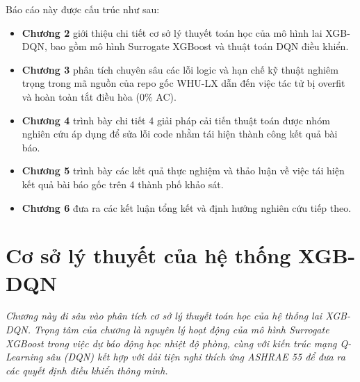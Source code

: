 \documentclass[12pt, a4paper]{report}
\begin{document}
Báo cáo này được cấu trúc như sau:
\begin{itemize}
    \item \textbf{Chương 2} giới thiệu chi tiết cơ sở lý thuyết toán học của mô hình lai XGB-DQN, bao gồm mô hình Surrogate XGBoost và thuật toán DQN điều khiển.
    \item \textbf{Chương 3} phân tích chuyên sâu các lỗi logic và hạn chế kỹ thuật nghiêm trọng trong mã nguồn của repo gốc WHU-LX dẫn đến việc tác tử bị overfit và hoàn toàn tắt điều hòa (0\% AC).
    \item \textbf{Chương 4} trình bày chi tiết 4 giải pháp cải tiến thuật toán được nhóm nghiên cứu áp dụng để sửa lỗi code nhằm tái hiện thành công kết quả bài báo.
    \item \textbf{Chương 5} trình bày các kết quả thực nghiệm và thảo luận về việc tái hiện kết quả bài báo gốc trên 4 thành phố khảo sát.
    \item \textbf{Chương 6} đưa ra các kết luận tổng kết và định hướng nghiên cứu tiếp theo.
\end{itemize}

\chapter{Cơ sở lý thuyết của hệ thống XGB-DQN}

\textit{Chương này đi sâu vào phân tích cơ sở lý thuyết toán học của hệ thống lai XGB-DQN. Trọng tâm của chương là nguyên lý hoạt động của mô hình Surrogate XGBoost trong việc dự báo động học nhiệt độ phòng, cùng với kiến trúc mạng Q-Learning sâu (DQN) kết hợp với dải tiện nghi thích ứng ASHRAE 55 để đưa ra các quyết định điều khiển thông minh.}
\end{document}
